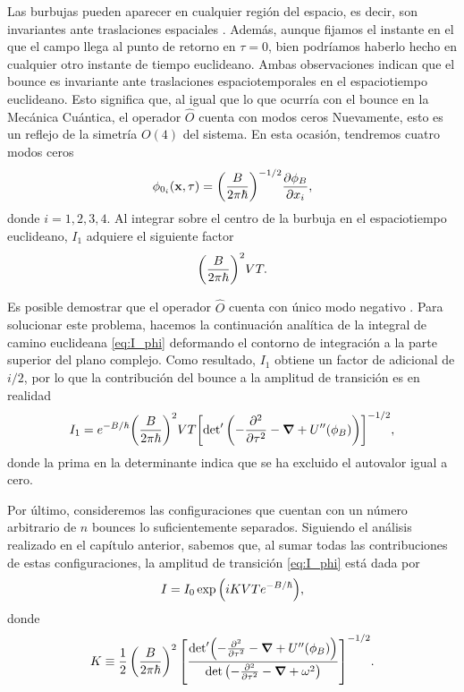 Las burbujas pueden aparecer en cualquier región del espacio, es decir, son invariantes ante traslaciones espaciales \cite{coleman1977fate}. Además, aunque fijamos el instante en el que el campo llega al punto de retorno en $\tau = 0$, bien podríamos haberlo hecho en cualquier otro instante de tiempo euclideano. Ambas observaciones indican que el bounce es invariante ante traslaciones espaciotemporales en el espaciotiempo euclideano. Esto significa que, al igual que lo que ocurría con el bounce en la Mecánica Cuántica, el operador $\hat{O}$ cuenta con modos ceros 
Nuevamente, esto es un reflejo de la simetría $O(4)$ del sistema. 
En esta ocasión, tendremos cuatro modos ceros
\begin{equation}
	\phi_{0_i}\qty(\vb{x}, \tau) = \qty(\frac{B}{2\pi\hbar})^{-1/2}\pdv{\phi_B}{x_i},
\end{equation}
donde $i = 1, 2, 3, 4$. Al 
integrar sobre el centro de la burbuja 
en el espaciotiempo euclideano, 
$I_1$ adquiere el siguiente factor
\begin{equation}
	\qty(\frac{B}{2\pi\hbar})^{2}VT.
\end{equation}

Es posible demostrar que el operador $\hat{O}$ cuenta con único modo negativo %
\cite{coleman1977fate, coleman1988quantum}. Para solucionar este problema, hacemos la continuación analítica de la integral de camino euclideana \eqref{eq:I_phi} deformando el contorno de integración a la parte superior del plano complejo. Como resultado, $I_1$ obtiene un factor de adicional de $i/2$, por lo que la contribución del bounce a la amplitud de transición es en realidad 
\begin{equation}
I_1 = e^{-B / \hbar} \qty(\frac{B}{2\pi\hbar})^{2}VT \qty[ \textrm{det}'\left(-\pdv[2]{\tau} -\grad{} + U''\qty(\phi_B) \right) ]^{-1/2},
\end{equation}
donde la prima en la determinante indica que se ha excluido el autovalor igual a cero. 

Por último, consideremos las configuraciones que cuentan con un número arbitrario de $n$ bounces lo suficientemente separados. Siguiendo el análisis realizado en el capítulo anterior, sabemos que, al sumar todas las contribuciones de estas configuraciones, la amplitud de transición \eqref{eq:I_phi} está dada por
\begin{equation} \label{eq:I_phi_final}
	I = I_0 \exp\qty(iKVTe^{-B/\hbar}),
\end{equation}
donde
\begin{equation}
K \equiv \frac{1}{2} \left(\frac{B}{2\pi\hbar}\right)^2 \qty[ \frac{\textrm{det}' \qty(-\pdv[2]{\tau} -\grad{} + U''\qty(\phi_B) )}{\det \qty(-\pdv[2]{\tau} -\grad{} + \omega^2 )} ]^{-1/2}.
\end{equation}

